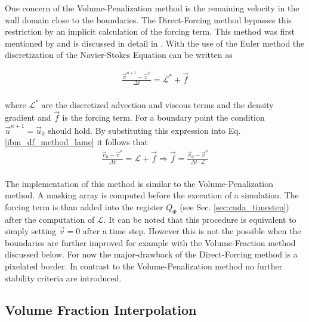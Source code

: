 One concern of the Volume-Penalization method is the remaining velocity in the wall domain close to the boundaries.
The Direct-Forcing method bypasses this restriction by an implicit calculation of the forcing term.
This method was first mentioned by \citep{mohdyusof:1997} and is discussed in detail in \citep{Fadlun2000}.
With the use of the Euler method the discretization of the Navier-Stokes Equation can be written as

\begin{align}
    \label{ibm_df_method_lame}
    \frac{\vec{v}^{n+1} -\vec{v}^n}{\Delta t} = \mathscr{L}^* + \vec{f}\\
\end{align}

where $\mathscr{L^*}$ are the discretized advection and viscous terms and the density gradient and $\vec{f}$ is the forcing term.
For a boundary point the condition $\vec{u}^{n+1} = \vec{u}_0$ should hold.
By substituting this expression into Eq. \ref{ibm_df_method_lame} it follows that
\begin{align}
    \frac{\vec{v}_0 -\vec{v}^n}{\Delta t} = \mathscr{L} + \vec{f} \Rightarrow \vec{f} = \frac{\vec{v}_0 -\vec{v}^n}{\Delta t\cdot \mathscr{L}}\\
\end{align}

The implementation of this method is similar to the Volume-Penalization method.
A masking array is computed before the execution of a simulation.
The forcing term is than added into the register $Q_\Phi$ (see Sec. \ref{sec:cuda_timestep}) after the computation of $\mathscr{L}$.
It can be noted that this procedure is equivalent to simply setting $\vec{v}=0$ after a time step.
However this is not the possible when the boundaries are further improved for example with the Volume-Fraction method discussed below.
For now the major-drawback of the Direct-Forcing method is a pixelated border.
In contrast to the Volume-Penalization method no further stability criteria are introduced.

\subsection{Volume Fraction Interpolation}

